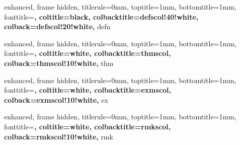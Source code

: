 
\usepackage{xcolor}


{
    enhanced,
    frame hidden,
    titlerule=0mm,
    toptitle=1mm,
    bottomtitle=1mm,
    fonttitle=\bfseries\large,
    coltitle=black,
    colbacktitle=defscol!40!white,
    colback=defscol!20!white,
}{defn}


{
    enhanced,
    frame hidden,
    titlerule=0mm,
    toptitle=1mm,
    bottomtitle=1mm,
    fonttitle=\bfseries\large,
    coltitle=white,
    colbacktitle=thmscol,
    colback=thmscol!10!white,
}{thm}


{
    enhanced,
    frame hidden,
    titlerule=0mm,
    toptitle=1mm,
    bottomtitle=1mm,
    fonttitle=\bfseries\large,
    coltitle=white,
    colbacktitle=exmscol,
    colback=exmscol!10!white,
}{ex}


{
    enhanced,
    frame hidden,
    titlerule=0mm,
    toptitle=1mm,
    bottomtitle=1mm,
    fonttitle=\bfseries\large,
    coltitle=white,
    colbacktitle=rmkscol,
    colback=rmkscol!10!white,
}{rmk}

